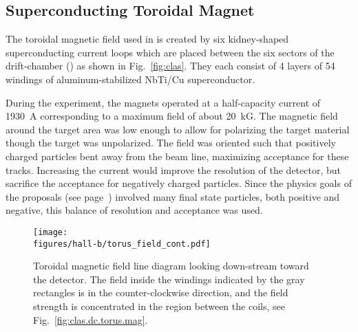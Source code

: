 \subsection{\label{sec:clas.dc.torus}Superconducting Toroidal Magnet}

The toroidal magnetic field used in  is created by six kidney-shaped superconducting current loops\cite{clas} which are placed between the six sectors of the drift-chamber () as shown in Fig.~\ref{fig:clas}. They each consist of 4 layers of 54 windings of aluminum-stabilized NbTi/Cu superconductor.

During the  experiment, the magnets operated at a half-capacity current of 1930~A corresponding to a maximum field of about 20~kG. The magnetic field around the target area was low enough to allow for polarizing the target material though the  target was unpolarized. The field was oriented such that positively charged particles bent away from the beam line, maximizing acceptance for these tracks. Increasing the current would improve the resolution of the detector, but sacrifice the acceptance for negatively charged particles. Since the physics goals of the  proposals (see page~\pageref{sec:clas.g12}) involved many final state particles, both positive and negative, this balance of resolution and acceptance was used.

\begin{figure}\begin{center}
\texttt{[image: \\figures/hall-b/torus\_field\_cont.pdf]}
\caption[Magnetic Field Line Diagram]{\label{fig:clas.dc.torus.cont}Toroidal magnetic field line diagram looking down-stream toward the  detector. The field inside the windings indicated by the gray rectangles is in the counter-clockwise direction, and the field strength is concentrated in the region between the coils, see Fig.~\ref{fig:clas.dc.torus.mag}.}
\end{center}\end{figure}


